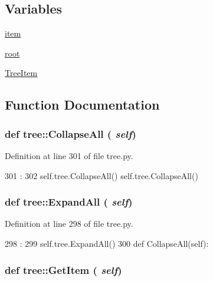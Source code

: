 \subsection*{Variables}
\begin{DoxyCompactItemize}
\item 
\hyperlink{namespacetree_a2169f3aaac3e182d20ba5af0f5450cd6}{item}
\item 
\hyperlink{namespacetree_ac3a21525804e0802174c4f4e12187e66}{root}
\item 
\hyperlink{namespacetree_a68d26aeb2ad43a1c46091dcbeb4c4e4d}{TreeItem}
\end{DoxyCompactItemize}


\subsection{Function Documentation}
\hypertarget{namespacetree_ab585b5906ff931f9eeeadf1a2d2059f1}{
\subsubsection[{CollapseAll}]{\setlength{\rightskip}{0pt plus 5cm}def tree::CollapseAll ( {\em self})}}
\label{namespacetree_ab585b5906ff931f9eeeadf1a2d2059f1}


Definition at line 301 of file tree.py.


\begin{DoxyCode}
301                          :
302         self.tree.CollapseAll()
        self.tree.CollapseAll()
\end{DoxyCode}
\hypertarget{namespacetree_a1708bde1ac7b61350f5c2176a7f4b2fd}{
\subsubsection[{ExpandAll}]{\setlength{\rightskip}{0pt plus 5cm}def tree::ExpandAll ( {\em self})}}
\label{namespacetree_a1708bde1ac7b61350f5c2176a7f4b2fd}


Definition at line 298 of file tree.py.


\begin{DoxyCode}
298                        :
299         self.tree.ExpandAll()
300 
    def CollapseAll(self):
\end{DoxyCode}
\hypertarget{namespacetree_a086fab4ad54004db618910da32a2849e}{
\subsubsection[{GetItem}]{\setlength{\rightskip}{0pt plus 5cm}def tree::GetItem ( {\em self})}}
\label{namespacetree_a086fab4ad54004db618910da32a2849e}


